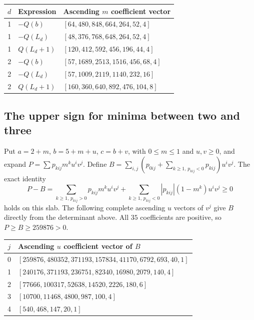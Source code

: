 \begingroup
\small
\setlength{\tabcolsep}{4pt}
\noindent\begin{tabular}{clp{11.6cm}}
\toprule
$d$ & Expression & Ascending $m$ coefficient vector\\
\midrule
1 & $-Q(b)$ & $[64,\allowbreak 480,\allowbreak 848,\allowbreak 664,\allowbreak 264,\allowbreak 52,\allowbreak 4]$\\
1 & $-Q(L_d)$ & $[48,\allowbreak 376,\allowbreak 768,\allowbreak 648,\allowbreak 264,\allowbreak 52,\allowbreak 4]$\\
1 & $Q(L_d+1)$ & $[120,\allowbreak 412,\allowbreak 592,\allowbreak 456,\allowbreak 196,\allowbreak 44,\allowbreak 4]$\\
2 & $-Q(b)$ & $[57,\allowbreak 1689,\allowbreak 2513,\allowbreak 1516,\allowbreak 456,\allowbreak 68,\allowbreak 4]$\\
2 & $-Q(L_d)$ & $[57,\allowbreak 1009,\allowbreak 2119,\allowbreak 1140,\allowbreak 232,\allowbreak 16]$\\
2 & $Q(L_d+1)$ & $[160,\allowbreak 360,\allowbreak 640,\allowbreak 892,\allowbreak 476,\allowbreak 104,\allowbreak 8]$\\
\bottomrule
\end{tabular}
\endgroup

\subsection{The upper sign for minima between two and three}

Put $a=2+m$, $b=5+m+u$, $c=b+v$, with $0\leq m\leq1$ and $u,v\geq0$,
and expand $P=\sum p_{kij}m^ku^iv^j$. Define
$B=\sum_{i,j}(p_{0ij}+\sum_{k\geq1,\,p_{kij}<0}p_{kij})u^iv^j$.
The exact identity
\[
 P-B=\sum_{k\geq1,\,p_{kij}>0}p_{kij}m^ku^iv^j
       +\sum_{k\geq1,\,p_{kij}<0}|p_{kij}|(1-m^k)u^iv^j\geq0
\]
holds on this slab. The following complete ascending $u$ vectors of $v^j$
give $B$ directly from the determinant above. All $35$ coefficients
are positive, so $P\geq B\geq259876>0$.

\begingroup
\scriptsize
\setlength{\tabcolsep}{4pt}
\noindent\begin{tabular}{cp{14.0cm}}
\toprule
$j$ & Ascending $u$ coefficient vector of $B$\\
\midrule
0 & $[259876,\allowbreak 480352,\allowbreak 371193,\allowbreak 157834,\allowbreak 41170,\allowbreak 6792,\allowbreak 693,\allowbreak 40,\allowbreak 1]$\\
1 & $[240176,\allowbreak 371193,\allowbreak 236751,\allowbreak 82340,\allowbreak 16980,\allowbreak 2079,\allowbreak 140,\allowbreak 4]$\\
2 & $[77666,\allowbreak 100317,\allowbreak 52638,\allowbreak 14520,\allowbreak 2226,\allowbreak 180,\allowbreak 6]$\\
3 & $[10700,\allowbreak 11468,\allowbreak 4800,\allowbreak 987,\allowbreak 100,\allowbreak 4]$\\
4 & $[540,\allowbreak 468,\allowbreak 147,\allowbreak 20,\allowbreak 1]$\\
\bottomrule
\end{tabular}
\endgroup
